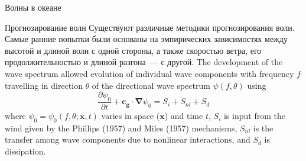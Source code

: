 \begin{chapter}{Волны в океане}
\begin{section}{Прогнозирование волн}
Существуют различные методики прогнозирования волн. Самые ранние попытки
были основаны на эмпирических зависимостях между высотой и длиной волн с одной
стороны, а также скоростью ветра, его продолжительностью и длиной
разгона~--- с другой. 
The development of
the wave spectrum allowed evolution of individual wave components with
frequency $f$ travelling in direction $\theta $ of the directional
wave spectrum $\psi (f, \theta )$ using
\begin{equation}
\frac{\partial \psi_0 }{\partial t} + \mathbf{c_g \cdot \nabla }\psi_0 = S_{i}
+ S_{nl} + S_{d}
\end{equation}
where $\psi_0 = \psi _0 (f, \theta ; \mathbf{x},t)$ varies in space
($\mathbf x$) and time $t$, $S_{i}$ is input from the wind given by
the Phillips (1957) and Miles (1957) mechanisms, $S_{nl}$ is the
transfer among wave components due to nonlinear interactions, and
$S_{d}$ is dissipation.
%


\end{section}
\end{chapter}
